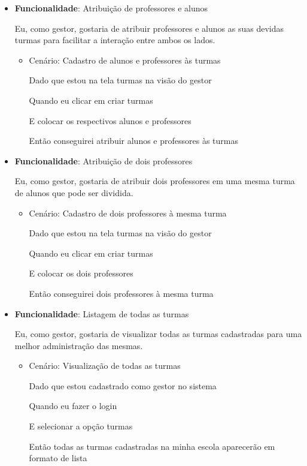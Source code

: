 \begin{itemize}
\item\textbf{Funcionalidade}: Atribuição de professores e alunos
    
    Eu, como gestor, gostaria de atribuir professores e alunos as suas devidas turmas para facilitar a interação entre ambos os lados.
    \begin{itemize}
        \item Cenário: Cadastro de alunos e professores às turmas
        \par Dado que estou na tela turmas na visão do gestor
        \par Quando eu clicar em criar turmas
        \par E colocar os respectivos alunos e professores
        \par Então conseguirei atribuir alunos e professores às turmas
    \end{itemize}

\item\textbf{Funcionalidade}: Atribuição de dois professores 
    
    Eu, como gestor, gostaria de atribuir dois professores em uma mesma turma de alunos que pode ser dividida.
    \begin{itemize}
        \item Cenário: Cadastro de dois professores à mesma turma
        \par Dado que estou na tela turmas na visão do gestor
        \par Quando eu clicar em criar turmas
        \par E colocar os dois professores
        \par Então conseguirei dois professores à mesma turma
    \end{itemize}

\item\textbf{Funcionalidade}: Listagem de todas as turmas
    
    Eu, como gestor, gostaria de visualizar todas as turmas cadastradas para uma melhor administração das mesmas.
    \begin{itemize}
        \item Cenário: Visualização de todas as turmas 
        \par Dado que estou cadastrado como gestor no sistema
        \par Quando eu fazer o login
        \par E selecionar a opção turmas
        \par Então todas as turmas cadastradas na minha escola aparecerão em formato de lista
    \end{itemize}  


\end{itemize}
